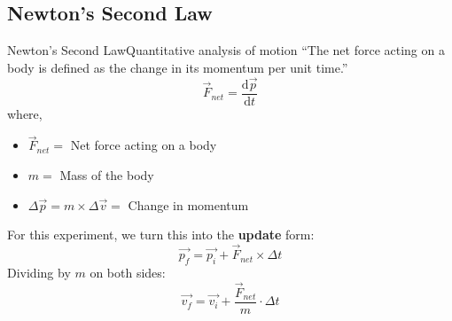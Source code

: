 





\subsection{Newton's Second Law}
\begin{frame}{Newton's Second Law}{Quantitative analysis of motion}
	``The net force acting on a body is defined as the change in its 
	momentum per unit time.''
	\begin{equation}
	\vec{F}_{net} = \frac{\mathrm{d}\vec{p}}{\mathrm{d}t}
	\end{equation}
	where,
	\begin{itemize}
	\item \(\vec{F}_{net} = \) Net force acting on a body
	\item \(m = \) Mass of the body
	\item \(\Delta\vec{p} = m\times\Delta\vec{v} = \)
		Change in momentum
	\end{itemize}
	For this experiment, we turn this into the \textbf{update} form:
	\[ \vec{p_f} = \vec{p_i} + \vec{F}_{net} \times \Delta t \]
	Dividing by \(m\) on both sides:
	\begin{equation}\label{VelocityUpdate}
	\vec{v_f} = \vec{v_i} + \frac{\vec{F}_{net}}{m} \cdot \Delta t
	\end{equation}
\end{frame}